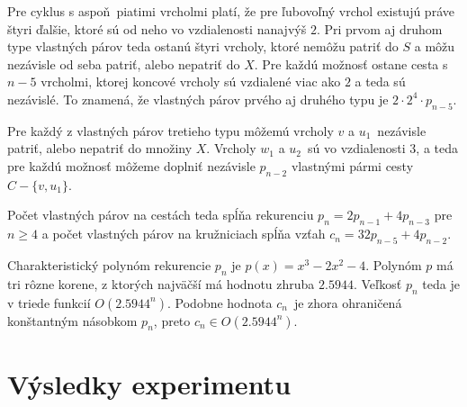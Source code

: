 Pre cyklus s aspoň piatimi vrcholmi platí, že pre ľubovoľný vrchol existujú práve štyri ďalšie, ktoré
sú od neho vo vzdialenosti nanajvýš $2$. Pri prvom aj druhom type vlastných párov teda ostanú
štyri vrcholy, ktoré nemôžu patriť do $S$ a môžu nezávisle od seba patriť, alebo nepatriť do $X$.
Pre každú možnosť ostane cesta s $n - 5$ vrcholmi, ktorej koncové vrcholy sú vzdialené viac ako $2$
a teda sú nezávislé. To znamená, že vlastných párov prvého aj druhého typu je $2 \cdot 2^4 \cdot p_{n-5}$.

Pre každý z vlastných párov tretieho typu môžemú vrcholy $v$ a $u_1$ nezávisle patriť, alebo nepatriť
do množiny $X$. Vrcholy $w_1$ a $u_2$ sú vo vzdialenosti $3$, a teda pre každú možnosť môžeme
doplniť nezávisle $p_{n-2}$ vlastnými pármi cesty $C - \{v, u_1\}$.

Počet vlastných párov na cestách teda spĺňa rekurenciu $p_n = 2p_{n-1} + 4p_{n-3}$ pre $n \ge 4$
a počet vlastných párov na kružniciach spĺňa vzťah $c_n = 32 p_{n-5} + 4p_{n-2}$.

Charakteristický polynóm rekurencie $p_n$ je $p(x) = x^3 - 2x^2 - 4$. Polynóm $p$ má tri rôzne
korene, z ktorých najväčší má hodnotu zhruba $2.5944$. Veľkosť $p_n$ teda je v triede funkcií
$O(2.5944^n)$. Podobne hodnota $c_n$ je zhora ohraničená konštantným násobkom $p_n$, preto
$c_n \in O(2.5944^n)$.

\section{Výsledky experimentu}

